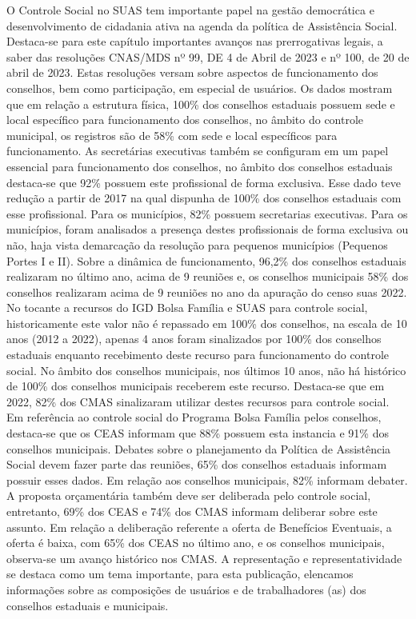 \documentclass[
  brazilian]{report}
\begin{document}
O Controle Social no SUAS tem importante papel na gestão democrática e
desenvolvimento de cidadania ativa na agenda da política de Assistência
Social. Destaca-se para este capítulo importantes avanços nas
prerrogativas legais, a saber das resoluções CNAS/MDS nº 99, DE 4 de
Abril de 2023 e nº 100, de 20 de abril de 2023. Estas resoluções versam
sobre aspectos de funcionamento dos conselhos, bem como participação, em
especial de usuários. Os dados mostram que em relação a estrutura
física, 100\% dos conselhos estaduais possuem sede e local específico
para funcionamento dos conselhos, no âmbito do controle municipal, os
registros são de 58\% com sede e local específicos para funcionamento.
As secretárias executivas também se configuram em um papel essencial
para funcionamento dos conselhos, no âmbito dos conselhos estaduais
destaca-se que 92\% possuem este profissional de forma exclusiva. Esse
dado teve redução a partir de 2017 na qual dispunha de 100\% dos
conselhos estaduais com esse profissional. Para os municípios, 82\%
possuem secretarias executivas. Para os municípios, foram analisados a
presença destes profissionais de forma exclusiva ou não, haja vista
demarcação da resolução para pequenos municípios (Pequenos Portes I e
II). Sobre a dinâmica de funcionamento, 96,2\% dos conselhos estaduais
realizaram no último ano, acima de 9 reuniões e, os conselhos municipais
58\% dos conselhos realizaram acima de 9 reuniões no ano da apuração do
censo suas 2022. No tocante a recursos do IGD Bolsa Família e SUAS para
controle social, historicamente este valor não é repassado em 100\% dos
conselhos, na escala de 10 anos (2012 a 2022), apenas 4 anos foram
sinalizados por 100\% dos conselhos estaduais enquanto recebimento deste
recurso para funcionamento do controle social. No âmbito dos conselhos
municipais, nos últimos 10 anos, não há histórico de 100\% dos conselhos
municipais receberem este recurso. Destaca-se que em 2022, 82\% dos CMAS
sinalizaram utilizar destes recursos para controle social. Em referência
ao controle social do Programa Bolsa Família pelos conselhos, destaca-se
que os CEAS informam que 88\% possuem esta instancia e 91\% dos
conselhos municipais. Debates sobre o planejamento da Política de
Assistência Social devem fazer parte das reuniões, 65\% dos conselhos
estaduais informam possuir esses dados. Em relação aos conselhos
municipais, 82\% informam debater. A proposta orçamentária também deve
ser deliberada pelo controle social, entretanto, 69\% dos CEAS e 74\%
dos CMAS informam deliberar sobre este assunto. Em relação a deliberação
referente a oferta de Benefícios Eventuais, a oferta é baixa, com 65\%
dos CEAS no último ano, e os conselhos municipais, observa-se um avanço
histórico nos CMAS. A representação e representatividade se destaca como
um tema importante, para esta publicação, elencamos informações sobre as
composições de usuários e de trabalhadores (as) dos conselhos estaduais
e municipais.
\end{document}
